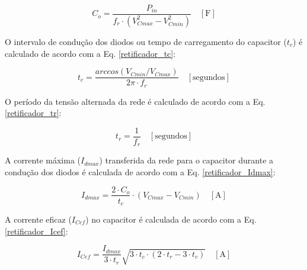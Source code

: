 \begin{apendicesenv}
    \begin{equation}
        C_{o} = \frac{P_{in}}{f_{r} \cdot \left( V_{Cmax}^{2} - V_{Cmin}^{2} \right)} \quad [\text{F}]
        \label{retificador_C}
    \end{equation}
    

O intervalo de condução dos diodos ou tempo de carregamento do capacitor ($t_{c}$) é calculado de acordo com a Eq. \ref{retificador_tc}:
    
    \begin{equation}
        t_{c} = \frac{arc cos(V_{Cmin}/V_{Cmax})}{2 \pi \cdot f_{r}} \quad [\text{segundos}]
        \label{retificador_tc}
    \end{equation}
    
O período da tensão alternada da rede é calculado de acordo com a Eq. \ref{retificador_tr}:
    
    \begin{equation}
        t_{r} = \frac{1}{f_{r}} \quad [\text{segundos}]
        \label{retificador_tr}
    \end{equation}

A corrente máxima ($I_{dmax}$) transferida da rede para o capacitor durante a condução dos diodos é calculada de acordo com a Eq. \ref{retificador_Idmax}:

    \begin{equation}
        I_{dmax} = \frac{2 \cdot C_{o}}{t_{c}} \cdot \left( V_{Cmax} - V_{Cmin} \right) \quad [\text{A}]
        \label{retificador_Idmax}
    \end{equation}
    
A corrente eficaz ($I_{Cef}$) no capacitor é calculada de acordo com a Eq. \ref{retificador_Icef}:
    
    \begin{equation}
        I_{Cef} = \frac{I_{dmax}}{3 \cdot t_{r}} \sqrt{3 \cdot t_{c} \cdot \left( 2 \cdot t_{r} - 3 \cdot t_{c} \right) } \quad [\text{A}]
        \label{retificador_Icef}
    \end{equation}
    
    
    

\end{apendicesenv}
